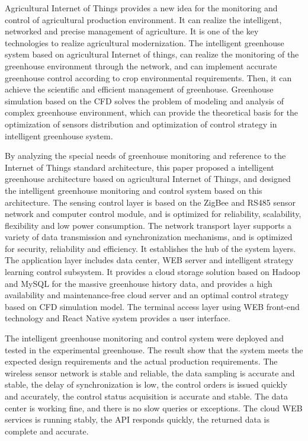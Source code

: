 \begin{englishabstract}

Agricultural Internet of Things provides a new idea for the monitoring and control of agricultural production environment. It can realize the intelligent, networked and precise management of agriculture. It is one of the key technologies to realize agricultural modernization. The intelligent greenhouse system based on agricultural Internet of things, can realize the monitoring  of the greenhouse environment through the network, and can implement accurate greenhouse control according to crop environmental requirements. Then, it can achieve the scientific and efficient management of greenhouse. Greenhouse simulation based on the CFD solves the problem of modeling and analysis of complex greenhouse environment, which can provide the theoretical basis for the optimization of sensors distribution and optimization of control strategy in intelligent greenhouse system.

By analyzing the special needs of greenhouse monitoring and reference to the Internet of Things standard architecture, this paper proposed a intelligent greenhouse architecture based on agricultural Internet of Things, and designed the intelligent greenhouse monitoring and control system based on this architecture. The sensing control layer is based on the ZigBee and RS485 sensor network and computer control module, and is optimized for reliability, scalability, flexibility and low power consumption. The network transport layer supports a variety of data transmission and synchronization mechanisms, and is optimized for security, reliability and efficiency. It establishes the hub of the system layers. The application layer includes data center, WEB server and intelligent strategy learning control subsystem. It provides a cloud storage solution based on Hadoop and MySQL for the massive greenhouse history data, and provides a high availability and maintenance-free cloud server and an optimal control strategy based on CFD simulation model. The terminal access layer using WEB front-end technology and React Native system provides a user interface.

The intelligent greenhouse monitoring and control system were deployed and tested in the experimental greenhouse. The result show that the system meets the expected design requirements and the actual production requirements. The wireless sensor network is stable and reliable, the data sampling is accurate and stable, the delay of synchronization is low, the control orders is issued quickly and accurately, the control status acquisition is accurate and stable. The data center is working fine, and there is no slow queries or exceptions. The cloud WEB services is running stably, the API responds quickly, the returned data is complete and accurate.


\end{englishabstract}
